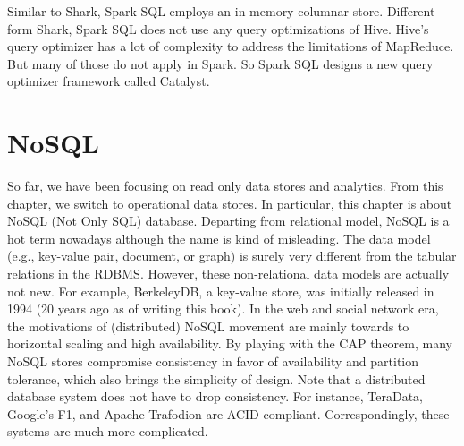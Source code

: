 \documentclass[11pt]{book}
\begin{document}
Similar to Shark, Spark SQL employs an in-memory columnar store. Different form Shark, Spark SQL does not use any query optimizations of Hive. Hive's query optimizer has a lot of complexity to address the limitations of MapReduce. But many of those do not apply in Spark. So Spark SQL designs a new query optimizer framework called Catalyst.

\chapter[NoSQL]
{NoSQL}
So far, we have been focusing on read only data stores and analytics. From this chapter, we switch to operational data stores. In particular, this chapter is about NoSQL (Not Only SQL) database. Departing from relational model,  NoSQL is a hot term nowadays although the name is kind of misleading. The data model (e.g., key-value pair, document, or graph) is surely very different from the tabular relations in the RDBMS. However, these non-relational data models are actually not new. For example, BerkeleyDB, a key-value store, was initially released in 1994 (20 years ago as of writing this book). In the web and social network era, the motivations of (distributed) NoSQL movement are mainly towards to horizontal scaling and high availability. By playing with the CAP theorem, many NoSQL stores compromise consistency in favor of availability and partition tolerance, which also brings the simplicity of design. Note that a distributed database system does not have to drop consistency. For instance, TeraData, Google's F1, and Apache Trafodion are ACID-compliant. Correspondingly, these systems are much more complicated.
\end{document}
